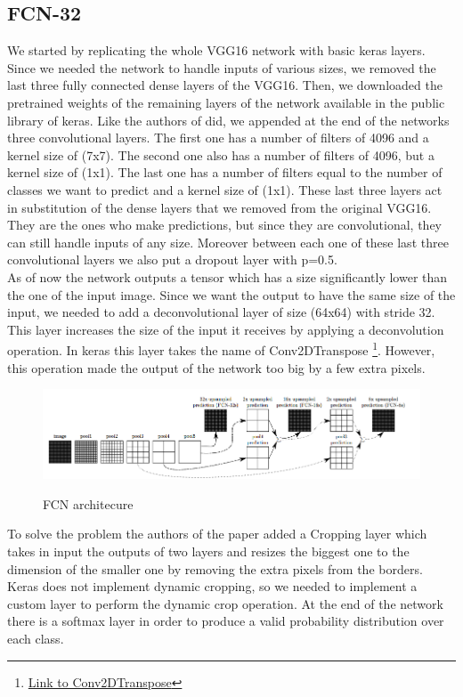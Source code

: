 \documentclass[10pt,twocolumn,letterpaper]{article}
\begin{document}
\subsection{FCN-32}
We started by replicating the whole VGG16 network with basic keras layers. Since we needed the network to handle inputs of various sizes, we removed the last three fully connected dense layers of the VGG16. Then, we downloaded the pretrained weights of the remaining layers of the network available in the public library of keras.
Like the authors of \cite{projectPaper} did, we appended at the end of the networks three convolutional layers. The first one has a number of filters of 4096 and a kernel size of (7x7). The second one also has a number of filters of 4096, but a kernel size of (1x1). The last one has a number of filters equal to the number of classes we want to predict and a kernel size of (1x1).
These last three layers act in substitution of the dense layers that we removed from the original VGG16. They are the ones who make predictions, but since they are convolutional, they can still handle inputs of any size.
Moreover between each one of these last three convolutional layers we also put a dropout layer with p=0.5.\\
As of now the network outputs a tensor which has a size significantly lower than the one of the input image. Since we want the output to have the same size of the input, we needed to add a deconvolutional layer of size (64x64) with stride 32. This layer increases the size of the input it receives by applying a deconvolution operation. In keras this layer takes the name of Conv2DTranspose \footnote{\href{https://www.tensorflow.org/api_docs/python/tf/keras/layers/Conv2DTranspose}{Link to Conv2DTranspose}}. However, this operation made the output of the network too big by a few extra pixels.\\
\begin{figure}
	\includegraphics[width=\textwidth]{image/fcn}
	\label{fcn}
	\centering
	\caption{FCN architecure}
\end{figure}
To solve the problem the authors of the paper added a Cropping layer which takes in input the outputs of two layers and resizes the biggest one to the dimension of the smaller one by removing the extra pixels from the borders. Keras does not implement dynamic cropping, so we needed to implement a custom layer to perform the dynamic crop operation. At the end of the network there is a softmax layer in order to produce a valid probability distribution over each class.
\end{document}
